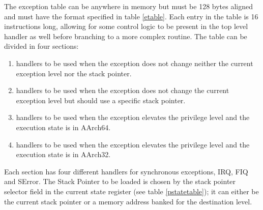 \documentclass[12pt,a4paper,openright,twoside]{report}
\begin{document}
The exception table can be anywhere in memory but must be 128 bytes aligned and 
must have the format specified in table \ref{etable}.
Each entry in the table is 16 instructions long, allowing for some control logic 
to be present in the top level handler as well before branching to a more complex
routine.
The table can be divided in four sections:
\begin{enumerate}
    \item handlers to be used when the exception does not change neither the current 
        exception level nor the stack pointer.
    \item handlers to be used when the exception does not change the current 
        exception level but should use a specific stack pointer.
    \item handlers to be used when the exception elevates the privilege level and
        the execution state is in AArch64.
    \item handlers to be used when the exception elevates the privilege level and
        the execution state is in AArch32.
\end{enumerate}

Each section has four different handlers for synchronous exceptions, IRQ, FIQ
and SError. The Stack Pointer to be loaded is chosen by the stack pointer selector
field in the current state register (see table \ref{pstatetable}); it can either be the current stack pointer or 
a memory address banked for the destination level.
\end{document}
